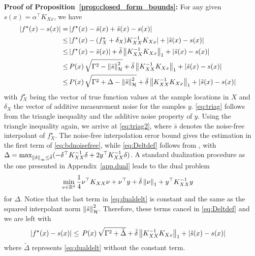 \begin{my_proof}
	\textbf{Proof of Proposition~\ref{prop:closed_form_bounds}:}
	For any given $s(x)=\alpha^\top K_{Xx}$, we have 
	\begin{align}\notag
		\vert f^\star(x) -s(x)\vert =& \, \vert f^\star(x) -\tilde{s}(x) + \tilde{s}(x)-s(x)\vert \\
		\le& \, \vert f^\star(x) - (f^\star_X + \delta_X) K_{XX}^{-1}K_{Xx}\vert + \vert  \tilde{s}(x)-s(x)\vert \label{eq:triag}\\
		\le& \, \vert f^\star(x) - \bar s(x)\vert + \bar \delta \left\| K_{XX}^{-1}K_{Xx} \right\|_1 + \vert  \tilde{s}(x)-s(x)\vert \label{eq:triag2}\\
		\le& \, P(x) \, \sqrt{ \Gamma^2  - \left\| \bar{s} \right\|_\mathcal{H}^2} + \bar \delta \left\| K_{XX}^{-1}K_{Xx} \right\|_1 + \vert  \tilde{s}(x)-s(x)\vert \label{eq:bdnoisefree}\\
		\le& \, P(x) \, \sqrt{ \Gamma^2 + \Delta - \left\| \tilde{s} \right\|_\mathcal{H}^2} + \bar \delta \left\| K_{XX}^{-1}K_{Xx} \right\|_1 + \vert  \tilde{s}(x)-s(x)\vert \label{eq:Deltdef}
	\end{align}
	with $f^\star_X$ being the vector of true function values at the sample locations in $X$ and $\delta_X$ the vector of additive measurement noise for the samples $y$. \eqref{eq:triag} follows from the triangle inequality and the additive noise property of $y$. Using the triangle inequality again, we arrive at \eqref{eq:triag2}, where $\bar s$ denotes the noise-free interpolant of $f^\star_X$. The noise-free interpolation error bound gives the estimation in the first term of \eqref{eq:bdnoisefree}, while \eqref{eq:Deltdef} follows from \cite[Lemma~1]{maddalena2020deterministic}, with $\Delta = \max_{\left\| \delta \right\|_\infty \leq \bar{\delta}} (- \delta^\top K_{XX}^{-1} \delta + 2 y ^\top K_{XX}^{-1} \delta)$. A standard dualization procedure as the one presented in Appendix~\ref{app.dual} leads to the dual problem
	\begin{equation}
		\label{eq:dualdelt}
		\min_{\nu \in \mathbb{R}^d} \frac{1}{4} \nu^\top K_{XX} \nu + \nu^\top y + \bar{\delta} \left\| \nu \right\|_1 + y^\top K_{XX}^{-1} y
	\end{equation}
	for $\Delta$. Notice that the last term in \eqref{eq:dualdelt} is constant and the same as the squared interpolant norm $\left\| \tilde{s} \right\|_\mathcal{H}^2$. Therefore, these terms cancel in \eqref{eq:Deltdef} and we are left with
	\begin{equation}
			\vert f^\star(x)-s(x)\vert  \le \, P(x) \, \sqrt{ \Gamma^2 + \tilde\Delta} + \bar \delta \left\| K_{XX}^{-1}K_{Xx} \right\|_1 + \vert  \tilde{s}(x)-s(x)\vert
	\end{equation}
	where $\tilde{\Delta}$ represents \eqref{eq:dualdelt} without the constant term.
\end{my_proof}

